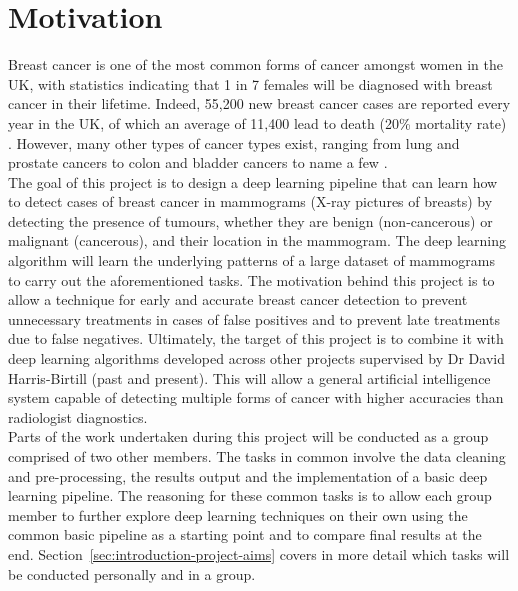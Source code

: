 \section{Motivation}

Breast cancer is one of the most common forms of cancer amongst women in the UK, with statistics indicating that 1 in 7 females will be diagnosed with breast cancer in their lifetime. Indeed, 55,200 new breast cancer cases are reported every year in the UK, of which an average of 11,400 lead to death (20\% mortality rate) \cite{BreastCancerResearchUK}. However, many other types of cancer types exist, ranging from lung and prostate cancers to colon and bladder cancers to name a few \cite{cokkinides2005american}.\\

The goal of this project is to design a deep learning pipeline that can learn how to detect cases of breast cancer in mammograms (X-ray pictures of breasts) by detecting the presence of tumours, whether they are benign (non-cancerous) or malignant (cancerous), and their location in the mammogram. The deep learning algorithm will learn the underlying patterns of a large dataset of mammograms to carry out the aforementioned tasks. The motivation behind this project is to allow a technique for early and accurate breast cancer detection to prevent unnecessary treatments in cases of false positives and to prevent late treatments due to false negatives. Ultimately, the target of this project is to combine it with deep learning algorithms developed across other projects supervised by Dr David Harris-Birtill (past and present). This will allow a general artificial intelligence system capable of detecting multiple forms of cancer with higher accuracies than radiologist diagnostics.\\

Parts of the work undertaken during this project will be conducted as a group comprised of two other members. The tasks in common involve the data cleaning and pre-processing, the results output and the implementation of a basic deep learning pipeline. The reasoning for these common tasks is to allow each group member to further explore deep learning techniques on their own using the common basic pipeline as a starting point and to compare final results at the end. Section~\ref{sec:introduction-project-aims} covers in more detail which tasks will be conducted personally and in a group.



